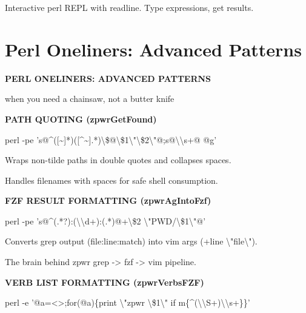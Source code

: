 \documentclass[11pt,a4paper,twoside]{book}
\begin{document}
Interactive perl REPL with readline. Type expressions, get results.


\vspace{16pt}

\section{Perl Oneliners: Advanced Patterns}


\vspace{10pt}
{\large\bfseries\color{neoncyan} PERL ONELINERS: ADVANCED PATTERNS}\vspace{6pt}

when you need a chainsaw, not a butter knife


\vspace{12pt}
{\bfseries\color{neonyellow} PATH QUOTING (zpwrGetFound)}\vspace{4pt}

\begin{codebox}
perl -pe 's@\textasciicircum{}([\textasciitilde{}]*)([\textasciicircum{}\textasciitilde{}].*)\textbackslash{}\$@\textbackslash{}\$1\textbackslash{}"\textbackslash{}\$2\textbackslash{}"@;s@\textbackslash{}\textbackslash{}s+@ @g'\\
\end{codebox}

Wraps non-tilde paths in double quotes and collapses spaces.

Handles filenames with spaces for safe shell consumption.


\vspace{12pt}
{\bfseries\color{neonyellow} FZF RESULT FORMATTING (zpwrAgIntoFzf)}\vspace{4pt}

\begin{codebox}
perl -pe 's@\textasciicircum{}(.*?):(\textbackslash{}\textbackslash{}d+):(.*)@+\textbackslash{}\$2 \textbackslash{}"PWD/\textbackslash{}\$1\textbackslash{}"@'\\
\end{codebox}

Converts grep output (file:line:match) into vim args (+line \textbackslash{}"file\textbackslash{}").

The brain behind zpwr grep -> fzf -> vim pipeline.


\vspace{12pt}
{\bfseries\color{neonyellow} VERB LIST FORMATTING (zpwrVerbsFZF)}\vspace{4pt}

\begin{codebox}
perl -e '@a=<>;for(@a)\{print \textbackslash{}"zpwr \textbackslash{}\$1\textbackslash{}" if m\{\textasciicircum{}(\textbackslash{}\textbackslash{}S+)\textbackslash{}\textbackslash{}s+\}\}'\\
\end{codebox}
\end{document}
